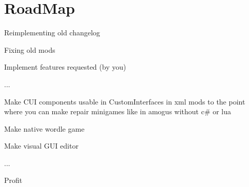 \chapter{Road\+Map }
\hypertarget{_road_map}{}\label{_road_map}
\label{_road_map_md__docs_sources_2_sources_25_01_road_map}%
%



\begin{DoxyItemize}
\item Reimplementing old changelog
\item Fixing old mods
\item Implement features requested (by you)
\item ...
\item Make CUI components usable in Custom\+Interfaces in xml mods to the point where you can make repair minigames like in amogus without c\# or lua
\item Make native wordle game
\item Make visual GUI editor
\item ...
\item Profit 
\end{DoxyItemize}